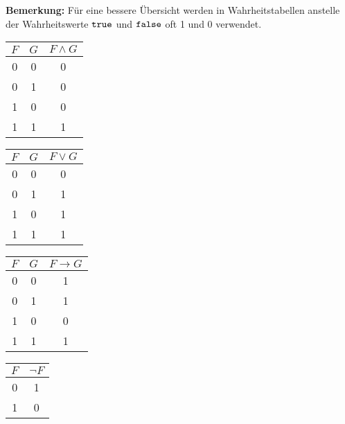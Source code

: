 \textbf{Bemerkung:} Für eine bessere Übersicht werden in Wahrheitstabellen anstelle der Wahrheitswerte $\texttt{true}$ und $\texttt{false}$ oft 1 und 0 verwendet.

\begin{multicols}{4}
    \centering
    \begin{tabular}{|c|c||c|}
        \hline
        $F$ & $G$ & $F \land G$ \\
        \hline
        0   & 0   & 0           \\
        0   & 1   & 0           \\
        1   & 0   & 0           \\
        1   & 1   & 1           \\
        \hline
    \end{tabular}
    \centering
    \begin{tabular}{|c|c||c|}
        \hline
        $F$ & $G$ & $F \lor G$ \\
        \hline
        0   & 0   & 0          \\
        0   & 1   & 1          \\
        1   & 0   & 1          \\
        1   & 1   & 1          \\
        \hline
    \end{tabular}
    \centering
    \begin{tabular}{|c|c||c|}
        \hline
        $F$ & $G$ & $F \rightarrow G$ \\
        \hline
        0   & 0   & 1                 \\
        0   & 1   & 1                 \\
        1   & 0   & 0                 \\
        1   & 1   & 1                 \\
        \hline
    \end{tabular}
    \centering
    \begin{tabular}{|c||c|}
        \hline
        $F$ & $\neg F$ \\
        \hline
        0   & 1        \\
        1   & 0        \\
        \hline
    \end{tabular}
\end{multicols}

\vspace{-\topsep}

